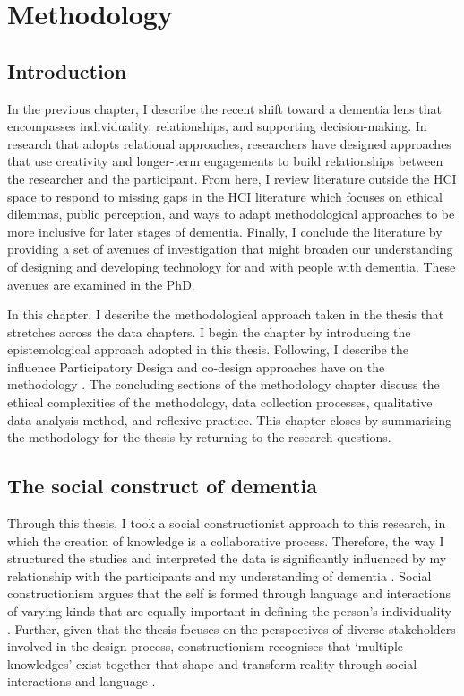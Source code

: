 \chapter{Methodology}
\label{Methodology}

\section{Introduction}
\label{Method:Intro}

In the previous chapter, I describe the recent shift toward a dementia lens that encompasses individuality, relationships, and supporting decision-making. In research that adopts relational approaches, researchers have designed approaches that use creativity and longer-term engagements to build relationships between the researcher and the participant. From here, I review literature outside the HCI space to respond to missing gaps in the HCI literature which focuses on ethical dilemmas, public perception, and ways to adapt methodological approaches to be more inclusive for later stages of dementia. Finally, I conclude the literature by providing a set of avenues of investigation that might broaden our understanding of designing and developing technology for and with people with dementia. These avenues are examined in the PhD.

In this chapter, I describe the methodological approach taken in the thesis that stretches across the data chapters. I begin the chapter by introducing the epistemological approach adopted in this thesis. Following, I describe the influence Participatory Design and co-design approaches have on the methodology \citep{duarte2018participatory}. The concluding sections of the methodology chapter discuss the ethical complexities of the methodology, data collection processes, qualitative data analysis method, and reflexive practice. This chapter closes by summarising the methodology for the thesis by returning to the research questions.  

\section{The social construct of dementia}
\label{social construct}
Through this thesis, I took a social constructionist approach to this research, in which the creation of knowledge is a collaborative process. Therefore, the way I structured the studies and interpreted the data is significantly influenced by my relationship with the participants and my understanding of dementia \citep{surr2006preservation}. Social constructionism argues that the self is formed through language and interactions of varying kinds that are equally important in defining the person's individuality \citep{sarup1996identity}. Further, given that the thesis focuses on the perspectives of diverse stakeholders involved in the design process, constructionism recognises that `multiple knowledges' exist together that shape and transform reality through social interactions and language \citep{mckeown2015you}.

